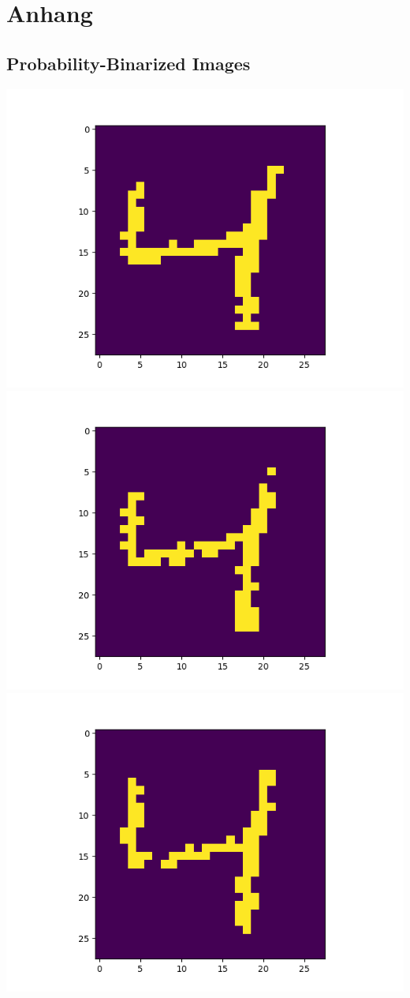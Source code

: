 \chapter{Anhang}
\section{Probability-Binarized Images}
\includegraphics[scale=0.2]{./bilder/comparison/prob/1}
\includegraphics[scale=0.2]{./bilder/comparison/prob/2}
\includegraphics[scale=0.2]{./bilder/comparison/prob/3}
